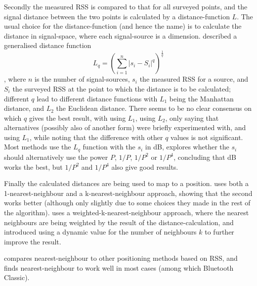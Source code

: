 Secondly the measured RSS is compared to that for all surveyed points, and the signal distance between the two points is calculated by a distance-function $L$.
The usual choice for the distance-function (and hence the name) is to calculate the distance in signal-space, where each signal-source is a dimension.
\citet{li2005method} described a generalised distance function
\begin{equation}
    L_q = \left(\sum_{i=1}^{n}|s_i-S_i|^q\right)^{\frac{1}{q}}
    \label{eq:architecture-distance}
\end{equation}
, where $n$ is the number of signal-sources, $s_i$ the measured RSS for a source, and $S_i$ the surveyed RSS at the point to which the distance is to be calculated; different $q$ lead to different distance functions with $L_1$ being the Manhattan distance, and $L_2$ the Euclidean distance.
There seems to be no clear consensus on which $q$ gives the best result, with \citet{shin2012enhanced} using $L_1$, \citet{bahl2000radar} using $L_2$, only saying that alternatives (possibly also of another form) were briefly experimented with, and \citet{li2005method} using $L_1$, while noting that the difference with other $q$ values is not significant.
Most methods use the $L_q$ function with the $s_i$ in dB, \citet{li2005method} explores whether the $s_i$ should alternatively use the power $P$, $1/P$, $1/P^2$ or $1/P^4$, concluding that dB works the best, but $1/P^2$ and $1/P^4$ also give good results.

Finally the calculated distances are being used to map to a position.
\citet{bahl2000radar} uses both a 1-nearest-neighbour and a k-nearest-neighbour approach, showing that the second works better (although only slightly due to some choices they made in the rest of the algorithm).
\citet{li2005method} uses a weighted-k-nearest-neighbour approach, where the nearest neighbours are being weighted by the result of the distance-calculation, and \citet{shin2012enhanced} introduced using a dynamic value for the number of neighbours $k$ to further improve the result.

\citet{pandya2003indoor} compares nearest-neighbour to other positioning methods based on RSS, and finds nearest-neighbour to work well in most cases (among which Bluetooth Classic).

